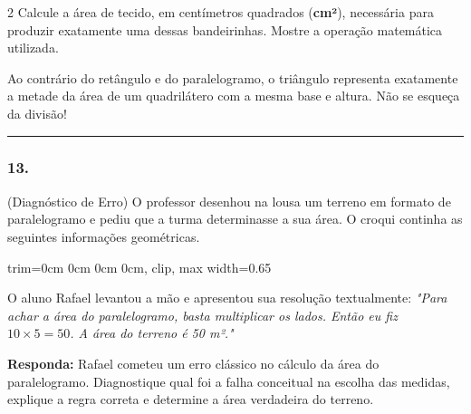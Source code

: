 \documentclass[twoside, 10pt, a4paper]{article}
\newlength{\espacoPreQuestao}\setlength{\espacoPreQuestao}{0.1cm}
\newlength{\espacoQuestao}\setlength{\espacoQuestao}{0.2cm}
\begin{document}
\begin{multicols*}{2}
Calcule a área de tecido, em centímetros quadrados (\textbf{cm²}), necessária para produzir exatamente uma dessas bandeirinhas. Mostre a operação matemática utilizada.
\par\vspace{\espacoQuestao}

\begin{boxdica}
Ao contrário do retângulo e do paralelogramo, o triângulo representa exatamente a metade da área de um quadrilátero com a mesma base e altura. Não se esqueça da divisão!
\end{boxdica}

\noindent\textcolor{CorLinha}{\rule{\linewidth}{0.5pt}} 
\par\vspace{\espacoPreQuestao}
\subsubsection*{13.} (Diagnóstico de Erro) O professor desenhou na lousa um terreno em formato de paralelogramo e pediu que a turma determinasse a sua área. O croqui continha as seguintes informações geométricas.

\begin{center}
\begin{adjustbox}{trim=0cm 0cm 0cm 0cm, clip, max width=0.65\linewidth}
\end{adjustbox}
\end{center}

O aluno Rafael levantou a mão e apresentou sua resolução textualmente: \textit{"Para achar a área do paralelogramo, basta multiplicar os lados. Então eu fiz $ 10 \times 5 = 50 $. A área do terreno é 50 m²."}

\begin{boxresponda}
\textbf{Responda:} Rafael cometeu um erro clássico no cálculo da área do paralelogramo. Diagnostique qual foi a falha conceitual na escolha das medidas, explique a regra correta e determine a área verdadeira do terreno.
\end{boxresponda}
\par\vspace{\espacoQuestao}


\end{multicols*}
\end{document}
